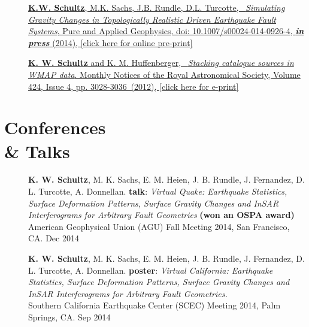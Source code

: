 \documentclass[margin,line]{resume}
\begin{document}
\begin{resume}
\begin{description}
\item[] \normalsize \href{http://link.springer.com/article/10.1007%2Fs00024-014-0926-4}{ \textbf{K.W. Schultz}, M.K. Sachs, J.B. Rundle, D.L. Turcotte, \ \emph{Simulating Gravity Changes in Topologically Realistic Driven Earthquake Fault Systems}, Pure and Applied Geophysics, doi: 10.1007/s00024-014-0926-4, \emph{\textbf{in press}} (2014), [click here for online pre-print]} \\

\item[] \normalsize \href{http://mnras.oxfordjournals.org/content/424/4/3028}{ \normalsize \textbf{K. W. Schultz} and K. M. Huffenberger, \ \emph{Stacking catalogue sources in WMAP data}. Monthly Notices of the Royal Astronomical Society, Volume 424, Issue 4, pp. 3028-3036\ (2012), [click here for e-print] }

\end{description}

\section{\mysidestyle \textbf{Conferences}  \\ \textbf{\&} \textbf{Talks}}
\begin{description}

   \item[] \textbf{K. W. Schultz}, M. K. Sachs, E. M. Heien, J. B. Rundle, J. Fernandez, D. L. Turcotte, A. Donnellan. \textbf{talk}: \emph{Virtual Quake: Earthquake Statistics, Surface Deformation Patterns, Surface Gravity Changes and InSAR Interferograms for Arbitrary Fault Geometries} \textbf{(won an OSPA award)} \\ American Geophysical Union (AGU) Fall Meeting 2014, San Francisco, CA. Dec 2014 \\

    \item[] \textbf{K. W. Schultz}, M. K. Sachs, E. M. Heien, J. B. Rundle, J. Fernandez, D. L. Turcotte, A. Donnellan. \textbf{poster}: \emph{Virtual California: Earthquake Statistics, Surface Deformation Patterns, Surface Gravity Changes and InSAR Interferograms for Arbitrary Fault Geometries.} \\ Southern California Earthquake Center (SCEC) Meeting 2014, Palm Springs, CA. Sep 2014



\end{description}
\end{resume}
\end{document}
